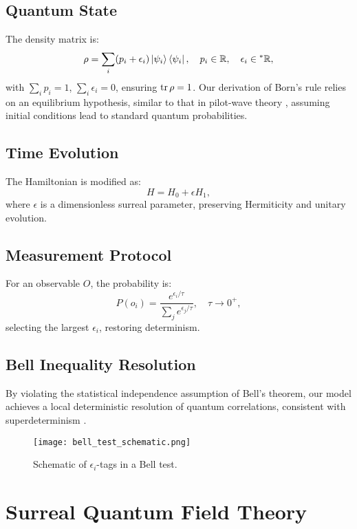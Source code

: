 \documentclass{article}
\begin{document}
\subsection{Quantum State}
The density matrix is:
\begin{equation}
\rho = \sum_i (p_i + \epsilon_i) \ket{\psi_i}\bra{\psi_i}, \quad p_i \in \mathbb{R}, \quad \epsilon_i \in {}^*\mathbb{R},
\end{equation}
with \(\sum_i p_i = 1\), \(\sum_i \epsilon_i = 0\), ensuring \(\tr \rho = 1\). Our derivation of Born's rule relies on an equilibrium hypothesis, similar to that in pilot-wave theory \cite{Valentini2005}, assuming initial conditions lead to standard quantum probabilities.

\subsection{Time Evolution}
The Hamiltonian is modified as:
\begin{equation}
H = H_0 + \epsilon H_1,
\end{equation}
where \(\epsilon\) is a dimensionless surreal parameter, preserving Hermiticity and unitary evolution.

\subsection{Measurement Protocol}
For an observable \(O\), the probability is:
\begin{equation}
P(o_i) = \frac{e^{\epsilon_i / \tau}}{\sum_j e^{\epsilon_j / \tau}}, \quad \tau \to 0^+,
\end{equation}
selecting the largest \(\epsilon_i\), restoring determinism.

\subsection{Bell Inequality Resolution}
By violating the statistical independence assumption of Bell’s theorem, our model achieves a local deterministic resolution of quantum correlations, consistent with superdeterminism \cite{Hossenfelder2019}.

\begin{figure}[h]
    \centering
    \texttt{[image: bell\_test\_schematic.png]}
    \caption{Schematic of \(\epsilon_i\)-tags in a Bell test.}
    \label{fig:bell_test}
\end{figure}

\section{Surreal Quantum Field Theory}
\end{document}
